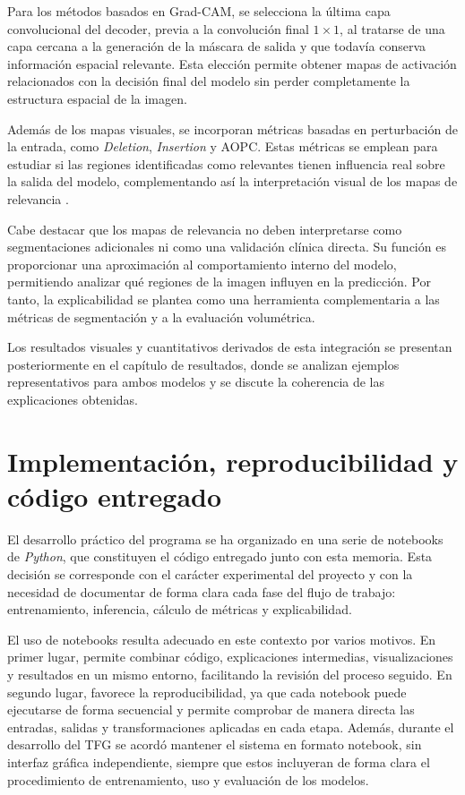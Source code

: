 Para los métodos basados en Grad-CAM, se selecciona la última capa convolucional del decoder, previa a la convolución final \(1 \times 1\), al tratarse de una capa cercana a la generación de la máscara de salida y que todavía conserva información espacial relevante. Esta elección permite obtener mapas de activación relacionados con la decisión final del modelo sin perder completamente la estructura espacial de la imagen.

Además de los mapas visuales, se incorporan métricas basadas en perturbación de la entrada, como \textit{Deletion}, \textit{Insertion} y AOPC. Estas métricas se emplean para estudiar si las regiones identificadas como relevantes tienen influencia real sobre la salida del modelo, complementando así la interpretación visual de los mapas de relevancia \citep{samek2017evaluating,petsiuk2018rise}.

Cabe destacar que los mapas de relevancia no deben interpretarse como segmentaciones adicionales ni como una validación clínica directa. Su función es proporcionar una aproximación al comportamiento interno del modelo, permitiendo analizar qué regiones de la imagen influyen en la predicción. Por tanto, la explicabilidad se plantea como una herramienta complementaria a las métricas de segmentación y a la evaluación volumétrica.

Los resultados visuales y cuantitativos derivados de esta integración se presentan posteriormente en el capítulo de resultados, donde se analizan ejemplos representativos para ambos modelos y se discute la coherencia de las explicaciones obtenidas.

\section[Implementación y reproducibilidad]{Implementación, reproducibilidad y código entregado}

El desarrollo práctico del programa se ha organizado en una serie de notebooks de \textit{Python}, que constituyen el código entregado junto con esta memoria. Esta decisión se corresponde con el carácter experimental del proyecto y con la necesidad de documentar de forma clara cada fase del flujo de trabajo: entrenamiento, inferencia, cálculo de métricas y explicabilidad.

El uso de notebooks resulta adecuado en este contexto por varios motivos. En primer lugar, permite combinar código, explicaciones intermedias, visualizaciones y resultados en un mismo entorno, facilitando la revisión del proceso seguido. En segundo lugar, favorece la reproducibilidad, ya que cada notebook puede ejecutarse de forma secuencial y permite comprobar de manera directa las entradas, salidas y transformaciones aplicadas en cada etapa. Además, durante el desarrollo del TFG se acordó mantener el sistema en formato notebook, sin interfaz gráfica independiente, siempre que estos incluyeran de forma clara el procedimiento de entrenamiento, uso y evaluación de los modelos.

